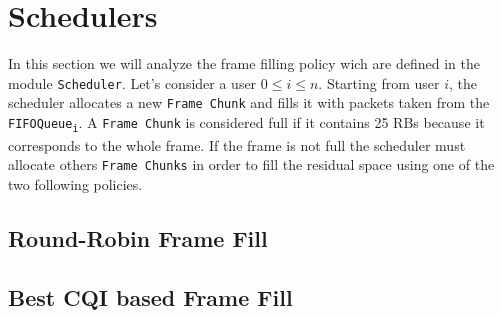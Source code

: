 \section{Schedulers}
  In this section we will analyze the frame filling policy wich are defined in the module \texttt{Scheduler}.
  Let's consider a user \(0\leq i\leq n\). Starting from user \(i\), the scheduler allocates a new \texttt{Frame Chunk} and fills it with packets taken from the \texttt{FIFOQueue\textsubscript{i}}. A \texttt{Frame Chunk} is considered full if it contains 25 RBs because it corresponds to the whole frame. If the frame is not full the scheduler must allocate others \texttt{Frame Chunks} in order to fill the residual space using one of the two following policies.
  
\subsection{Round-Robin Frame Fill}
\subsection{Best CQI based Frame Fill}